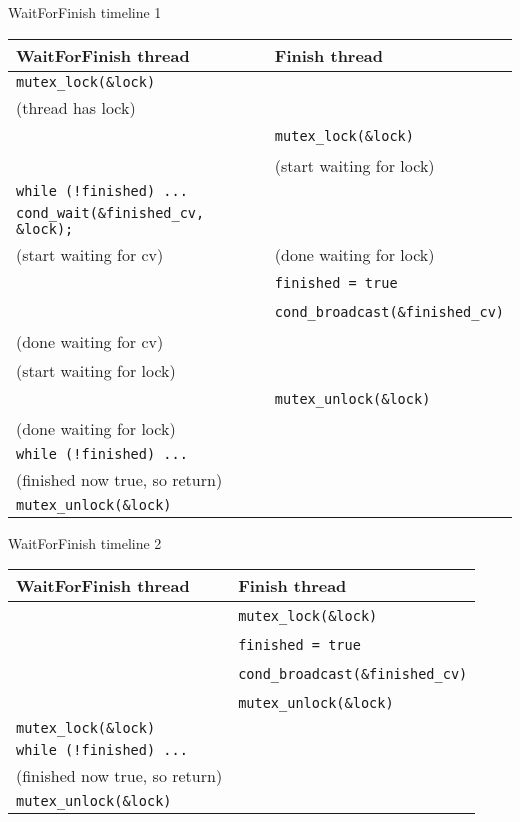 \begin{frame}[fragile,label=waitForFinishTimeline1]{WaitForFinish timeline 1}
\lstset{language=C++,style=smaller}
\small
  \vspace{-.25cm}
\begin{tabular}{l|l}
  \textbf{WaitForFinish thread} & \textbf{Finish thread} \\ \hline\hline
\lstinline|mutex_lock(&lock)| & \\
(thread has lock)             & \\ \hline
~                             & \lstinline|mutex_lock(&lock)|  \\
~                             & (start waiting for lock)\\ \hline
\lstinline|while (!finished) ...| & \\
\lstinline|cond_wait(&finished_cv, &lock);| & \\
(start waiting for cv) & (done waiting for lock) \\ \hline
~ & \lstinline|finished = true| \\
~ & \lstinline|cond_broadcast(&finished_cv)| \\ \hline
(done waiting for cv) & ~ \\
(start waiting for lock) & ~ \\ \hline
~ & \lstinline|mutex_unlock(&lock)| \\ \hline
(done waiting for lock) \\
\lstinline|while (!finished) ...| & \\
(finished now true, so return) \\
\lstinline|mutex_unlock(&lock)| \\
\end{tabular}
\end{frame}

\begin{frame}[fragile,label=waitForFinishTimeline2]{WaitForFinish timeline 2}
\lstset{language=C++,style=smaller}
\small
  \vspace{-.25cm}
\begin{tabular}{l|l}
  \textbf{WaitForFinish thread} & \textbf{Finish thread} \\ \hline\hline
~                             & \lstinline|mutex_lock(&lock)|  \\
~                             & \lstinline|finished = true| \\ 
~                             & \lstinline|cond_broadcast(&finished_cv)| \\ 
~                             & \lstinline|mutex_unlock(&lock)| \\ \hline
\lstinline|mutex_lock(&lock)| & \\
\lstinline|while (!finished) ...| & \\
(finished now true, so return) \\
\lstinline|mutex_unlock(&lock)| \\
\end{tabular}
\end{frame}

